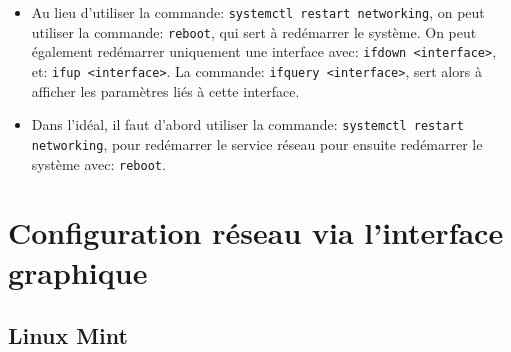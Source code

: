 \documentclass[a4paper]{article}
\renewcommand{\tt}{\texttt}
\begin{document}
\begin{itemize}
\item Au lieu d'utiliser la commande: \tt{systemctl restart networking}, on peut utiliser la commande: \tt{reboot}, qui sert à redémarrer le système. On peut également redémarrer uniquement une interface avec: \tt{ifdown <interface>}, et: \tt{ifup <interface>}. La commande: \tt{ifquery <interface>}, sert alors à afficher les paramètres liés à cette interface.




\item Dans l'idéal, il faut d'abord utiliser la commande: \tt{systemctl restart networking}, pour redémarrer le service réseau pour ensuite redémarrer le système avec: \tt{reboot}.





\end{itemize}















\section{Configuration réseau via l'interface graphique}










\subsection{Linux Mint} \label{subsec:MintGUI}
\end{document}

